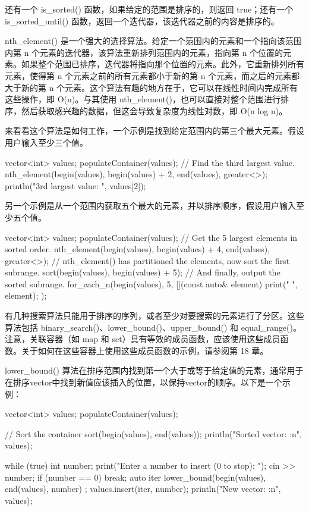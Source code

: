还有一个 is\_sorted() 函数，如果给定的范围是排序的，则返回 true；还有一个 is\_sorted\_until() 函数，返回一个迭代器，该迭代器之前的内容是排序的。

nth\_element() 是一个强大的选择算法。给定一个范围内的元素和一个指向该范围内第 n 个元素的迭代器，该算法重新排列范围内的元素，指向第 n 个位置的元素。如果整个范围已排序，迭代器将指向那个位置的元素。此外，它重新排列所有元素，使得第 n 个元素之前的所有元素都小于新的第 n 个元素，而之后的元素都大于新的第 n 个元素。这个算法有趣的地方在于，它可以在线性时间内完成所有这些操作，即 O(n)。与其使用 nth\_element()，也可以直接对整个范围进行排序，然后获取感兴趣的数据，但这会导致复杂度为线性对数，即 O(n log n)。

来看看这个算法是如何工作，一个示例是找到给定范围内的第三个最大元素。假设用户输入至少三个值。

\begin{cpp}
vector<int> values;
populateContainer(values);
// Find the third largest value.
nth_element(begin(values), begin(values) + 2, end(values), greater<>{});
println("3rd largest value: {}", values[2]);
\end{cpp}

另一个示例是从一个范围内获取五个最大的元素，并以排序顺序，假设用户输入至少五个值。

\begin{cpp}
vector<int> values;
populateContainer(values);
// Get the 5 largest elements in sorted order.
nth_element(begin(values), begin(values) + 4, end(values), greater<>{});
// nth_element() has partitioned the elements, now sort the first subrange.
sort(begin(values), begin(values) + 5);
// And finally, output the sorted subrange.
for_each_n(begin(values), 5, [](const auto& element) { print("{} ", element); });
\end{cpp}


有几种搜索算法只能用于排序的序列，或者至少对要搜索的元素进行了分区。这些算法包括 binary\_search()、lower\_bound()、upper\_bound() 和 equal\_range()。注意，关联容器（如 map 和 set）具有等效的成员函数，应该使用这些成员函数。关于如何在这些容器上使用这些成员函数的示例，请参阅第 18 章。

lower\_bound() 算法在排序范围内找到第一个大于或等于给定值的元素，通常用于在排序vector中找到新值应该插入的位置，以保持vector的顺序。以下是一个示例：

\begin{cpp}
vector<int> values;
populateContainer(values);

// Sort the container
sort(begin(values), end(values));
println("Sorted vector: {:n}", values);

while (true) {
    int number;
    print("Enter a number to insert (0 to stop): ");
    cin >> number;
    if (number == 0) { break; }
    auto iter { lower_bound(begin(values), end(values), number) };
    values.insert(iter, number);
    println("New vector: {:n}", values);
}
\end{cpp}

